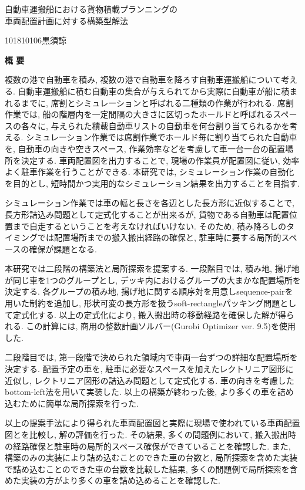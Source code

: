 \begin{center}
\begin{spacing}{1.3}
    {\LARGE 自動車運搬船における貨物積載プランニングの\\車両配置計画に対する構築型解法}\\[0.5cm]
\end{spacing}
\end{center}
\hfill
{\large 101810106\qquad 黒須諒}\\[0.5cm]
\begin{center}
{\Large \bf 概 要}\\
\end{center}

複数の港で自動車を積み, 複数の港で自動車を降ろす自動車運搬船について考える. 
自動車運搬船に積む自動車の集合が与えられてから実際に自動車が船に積まれるまでに, 席割とシミュレーションと呼ばれる二種類の作業が行われる. 
席割作業では, 船の階層内を一定間隔の大きさに区切ったホールドと呼ばれるスペースの各々に, 与えられた積載自動車リストの自動車を何台割り当てられるかを考える. 
シミュレーション作業では席割作業でホールド毎に割り当てられた自動車を, 自動車の向きや空きスペース, 作業効率などを考慮して車一台一台の配置場所を決定する. 
車両配置図を出力することで, 現場の作業員が配置図に従い, 効率よく駐車作業を行うことができる. 
本研究では, シミュレーション作業の自動化を目的とし, 短時間かつ実用的なシミュレーション結果を出力することを目指す. 

シミュレーション作業では車の幅と長さを各辺とした長方形に近似することで, 長方形詰込み問題として定式化することが出来るが, 貨物である自動車は配置位置まで自走するということを考えなければいけない. 
そのため, 積み降ろしのタイミングでは配置場所までの搬入搬出経路の確保と, 駐車時に要する局所的スペースの確保が課題となる. 

本研究では二段階の構築法と局所探索を提案する. 
一段階目では, 積み地, 揚げ地が同じ車を1つのグループとし, デッキ内におけるグループの大まかな配置場所を決定する. 
各グループの積み地, 揚げ地に関する順序対を用意しsequence-pairを用いた制約を追加し, 形状可変の長方形を扱うsoft-rectangleパッキング問題として定式化する. 
以上の定式化により, 搬入搬出時の移動経路を確保した解が得られる. 
この計算には, 商用の整数計画ソルバー(Gurobi Optimizer ver. 9.5)を使用した.  

二段階目では, 第一段階で決められた領域内で車両一台ずつの詳細な配置場所を決定する. 
配置予定の車を, 駐車に必要なスペースを加えたレクトリニア図形に近似し, レクトリニア図形の詰込み問題として定式化する. 
車の向きを考慮したbottom-left法を用いて実装した. 
以上の構築が終わった後, より多くの車を詰め込むために簡単な局所探索を行った.  

以上の提案手法により得られた車両配置図と実際に現場で使われている車両配置図とを比較し, 解の評価を行った. 
その結果, 多くの問題例において, 搬入搬出時の経路確保と駐車時の局所的スペース確保ができていることを確認した. 
また, 構築のみの実装により詰め込むことのできた車の台数と, 局所探索を含めた実装で詰め込むことのできた車の台数を比較した結果, 多くの問題例で局所探索を含めた実装の方がより多くの車を詰め込めることを確認した. 
